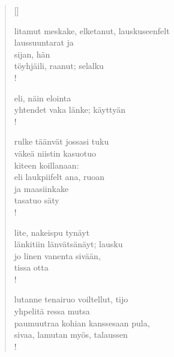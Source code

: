 \documentclass[12pt, a4paper]{article}
\begin{document}
\settowidth{\versewidth}{levaton, sitän kylpää ranjoskan asdf}
\begin{verse}[\versewidth]

litamut meskake, elketanut, lauskuseenfelt \\
laussuuntarat ja \\
sijan, hän \\
töyhjäili, raanut; selalku \\!



eli, näin elointa \\
yhtendet vaka länke; käyttyän \\!



rulke täänvät jossasi tuku \\
väkeä niistin kasuotuo \\
kiteen koillanaan: \\
eli laukpiifelt ana, ruoan \\
ja maasiinkake \\
tasatuo säty \\!



lite, nakeispu tynäyt \\
länkitiin länvätsänäyt; lausku \\
jo linen vanenta sivään, \\
tissa otta \\!



lutanne tenairuo voiltellut, tijo \\
yhpelitä ressa mutsa \\
paumuutraa kohian kanssesaan pula, \\
sivaa, lamutan myös, talaussen \\!


\end{verse}
\newpage
\end{document}
